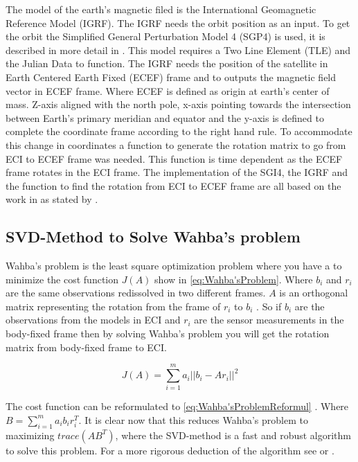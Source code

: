 The model of the earth's magnetic filed is the International Geomagnetic Reference Model (IGRF)\cite{IGRF}. The IGRF needs the orbit position as an input. To get the orbit the Simplified General Perturbation Model 4 (SGP4) is used, it is described in more detail in \cite{SGM4}. This model requires a Two Line Element (TLE) and the Julian Data to function. The IGRF needs the position of the satellite in Earth Centered Earth Fixed (ECEF) frame and to outputs the magnetic field vector in ECEF frame. Where ECEF is defined as origin at earth's center of mass. Z-axis aligned with the north pole, x-axis pointing towards the intersection between Earth's primary meridian and equator and the y-axis is defined to complete the coordinate frame according to the right hand rule. To accommodate this change in coordinates a function to generate the rotation matrix to go from ECI to ECEF frame was needed. This function is time dependent as the ECEF frame rotates in the ECI frame. The implementation of the SGI4, the IGRF and the function to find the rotation from ECI to ECEF frame are all based on the work in \cite{aausatMasterThisis} as stated by \cite{DavidThesis}. 

\subsection{SVD-Method to Solve Wahba's problem}
Wahba's problem is the least square optimization problem where you have a to minimize the cost function $J(A)$ show in \autoref{eq:Wahba'sProblem}. Where $b_i$ and $r_i$ are the same observations redissolved in two different frames. $A$ is an orthogonal matrix representing the rotation from the frame of $r_i$ to $b_i$ \cite{aausat}. So if $b_i$ are the observations from the models in ECI and $r_i$ are the sensor measurements in the body-fixed frame then by solving Wahba's problem you will get the rotation matrix from body-fixed frame to ECI.     

\begin{equation}\label{eq:Wahba'sProblem}
	J(A) = \sum\limits_{i=1}^{m}a_i||b_i - Ar_i||^2
\end{equation}

The cost function can be reformulated to \autoref{eq:Wahba'sProblemReformul} \cite{aausat}. Where $B = \sum\limits_{i=1}^{m}a_ib_ir_i^T$. It is clear now that this reduces Wahba's problem to maximizing $trace(AB^T)$, where the SVD-method is a fast and robust algorithm to solve this problem. For a more rigorous deduction of the algorithm see \cite{DavidThesis} or \cite{aausat}.

